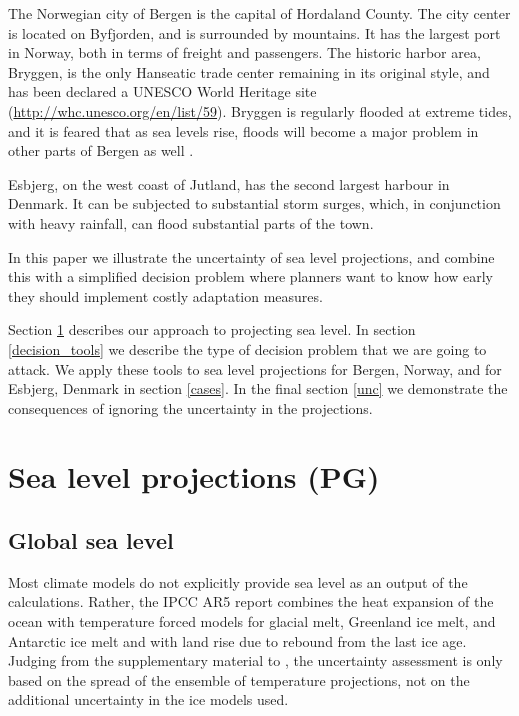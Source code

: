 \documentclass[draft,linenumbers]{agujournal}
\begin{document}
The Norwegian city of Bergen is the capital of Hordaland County. The city center is located on Byfjorden, and is surrounded by mountains. It has the largest port in Norway, both in terms of freight and passengers. The historic harbor area, Bryggen, is the only Hanseatic trade center remaining in its original style, and has been declared a UNESCO World Heritage site (\url{http://whc.unesco.org/en/list/59}). Bryggen is regularly flooded at extreme tides, and it is feared that as sea levels rise, floods will become a major problem in other parts of Bergen as well \citep{bergenreport}.

Esbjerg, on the west coast of Jutland,  has the second largest harbour in Denmark. It can be subjected to substantial storm surges, which, in conjunction with heavy rainfall, can flood substantial parts of the town.

In this paper we illustrate the uncertainty of sea level projections, and combine this with a simplified decision problem where planners want to know how early they should implement costly adaptation measures.

Section \ref{sealevelproj} describes our approach to projecting sea level. In section \ref{decision_tools} we describe the type of decision problem that we are going to attack. We apply these tools to  sea level projections for Bergen, Norway, and for Esbjerg, Denmark 
in section \ref{cases}.  In the final section \ref{unc}  we demonstrate the consequences of ignoring the uncertainty in the projections.

\section{Sea level projections {\color{blue} (PG)}}

\label{sealevelproj}

\subsection{Global sea level}
Most climate models do not explicitly provide sea level as an output of the calculations. Rather, the IPCC AR5 report \citep[ch.~13]{ipcc} combines the heat expansion of the ocean with temperature forced models for glacial melt, Greenland ice melt, and Antarctic ice melt and with land rise due to rebound from the last ice age. Judging from the supplementary material to \citet[ch.~13]{ipcc}, the uncertainty assessment is only based on the spread of the ensemble of temperature projections, not on the additional uncertainty in the ice models used.
\end{document}
